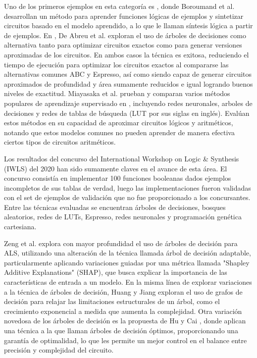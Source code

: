 Uno de los primeros ejemplos en esta categoría es
\cite{boroumand_learning_2021}, donde Boroumand et al. desarrollan un método
para aprender funciones lógicas de ejemplos y sintetizar circuitos basado en el
modelo aprendido, a lo que le llaman síntesis lógica a partir de ejemplos. En
\cite{de_abreu_fast_2021}, De Abreu et al. exploran el uso de árboles de
decisiones como alternativa tanto para optimizar circuitos exactos como para
generar versiones aproximadas de los circuitos. En ambos casos la técnica es
exitosa, reduciendo el tiempo de ejecución para optimizar los circuitos exactos
al compararse las alternativas comunes ABC y Espresso, así como siendo capaz de
generar circuitos aproximados de profundidad y área sumamente reducidos e igual
logrando buenos niveles de exactitud. Miayasaka et al. prueban y comparan
varios métodos populares de aprendizaje supervisado en
\cite{miyasaka_logic_2021}, incluyendo redes neuronales, arboles de decisiones
y redes de tablas de búsqueda (LUT por sus siglas en inglés). Evalúan estos
métodos en su capacidad de aproximar circuitos lógicos y aritméticos, notando
que estos modelos comunes no pueden aprender de manera efectiva ciertos tipos
de circuitos aritméticos.

Los resultados del concurso del International Workshop on Logic \& Synthesis
(IWLS) del 2020 \cite{rai_logic_2021} han sido sumamente claves en el avance de
esta área. El concurso consistía en implementar 100 funciones booleanas dados
ejemplos incompletos de sus tablas de verdad, luego las implementaciones fueron
validadas con el set de ejemplos de validación que no fue proporcionado a los
concursantes. Entre las técnicas evaluadas se encuentran árboles de decisiones,
bosques aleatorios, redes de LUTs, Espresso, redes neuronales y programación
genética cartesiana.


Zeng et al. \cite{zeng_sampling-based_2021} explora con mayor profundidad el
uso de árboles de decisión para ALS, utilizando una alteración de la técnica
llamada árbol de decisión adaptable, particularmente aplicando variaciones
guiadas por una métrica llamada "Shapley Additive Explanations" (SHAP), que
busca explicar la importancia de las características de entrada a un modelo.
En la misma línea de explorar variaciones a la técnica de árboles de decisión,
Huang y Jiang \cite{huang_circuit_2023} exploran el uso de grafos de decisión
para relajar las limitaciones estructurales de un árbol, como el crecimiento
exponencial a medida que aumenta la complejidad. Otra variación novedosa de los
árboles de decisión es la propuesta de Hu y Cai \cite{hu_optdtals_2024}, donde
aplican una técnica a la que llaman árboles de decisión óptimos, proporcionando
una garantía de optimalidad, lo que les permite un mejor control en el balance
entre precisión y complejidad del circuito.

